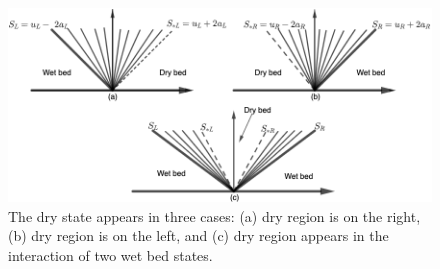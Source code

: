 \documentclass[12pt,a4paper]{article}
\begin{document}
	
	
	
	\begin{figure}[H]
		\centering
		\includegraphics[width=0.7\linewidth]{images/dry-wet}
		\caption{The dry state appears in three cases: (a) dry region is on the right, (b) dry region is on the left, and (c) dry region appears in the interaction of two wet bed states.}
		\label{fig:dry-wet}
	\end{figure}
	
\end{document}
